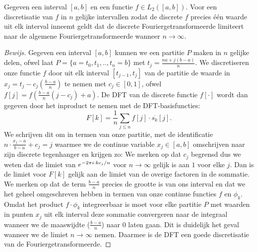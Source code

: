 \begin{stelling}
  Gegeven een interval $[a,b]$ en een functie $f\in L_2([a,b])$.
  Voor een discretisatie van $f$ in $n$ gelijke
  intervallen zodat de discrete $f$ precies \'e\'en waarde uit elk interval inneemt geldt dat de discrete
  Fouriergetransformeerde limiteert naar de algemene Fouriergetransformeerde wanneer $n\to\infty$.
\end{stelling}
\begin{proof}[Bewijs]
  Gegeven een interval $[a,b]$ kunnen we een partitie $P$ maken in $n$ gelijke delen, ofwel laat $P=\{a=t_0,t_1,..,t_n=b\}$ met $t_j = \tfrac{na + j(b-a)}{n}$.
  We discretiseren onze functie $f$ door uit elk interval $[t_{j-1},t_{j}]$ van de partitie de waarde in $x_j = t_j - c_j(\tfrac{b-a}{n})$ te nemen met $c_j \in [0,1]$, ofwel
  $f[j] = f(\frac{b-a}{n}(j-c_j) + a)$.
  De DFT van de discrete functie $f[\cdot]$ wordt dan gegeven door het inproduct te nemen met de DFT-basisfuncties:
  \[
  F[k] = \frac1n\sum_{j\leq n} f[j] \cdot \overline{s_k}[j].
  \]
  We schrijven dit om in termen van onze partitie, met de identificatie $n\cdot\tfrac{x_j-a}{b-a} + c_j= j$
  waarmee we de continue variable $x_j\in[a,b]$ omschrijven naar zijn discrete tegenhanger en krijgen zo:
  We merken op dat $c_j$ begrensd dus we weten dat de limiet van
  $e^{-{2\pi i}\cdot k c_j/n}$ voor $n\to\infty$ gelijk is aan $1$ voor elke $j$.
  Dan is de limiet voor $F[k]$ gelijk aan de limiet van de overige factoren in de sommatie.
  We merken op dat de term $\frac{b-a}{n}$ precies de grootte is van ons interval en dat we het geheel
  omgeschreven hebben in termen van onze continue functies $f$ en $\phi_k$.
  Omdat het product $f\cdot\phi_k$ integreerbaar is moet voor elke partitie $P$ met
  waarden in punten $x_j$ uit elk interval deze sommatie convergeren naar de integraal
  wanneer we de maaswijdte ($\tfrac{b-a}{n}$) naar $0$ laten gaan. Dit is duidelijk het geval wanneer we de limiet $n\to\infty$ nemen. Daarmee is de DFT een goede discretisatie van de Fouriergetransformeerde.
\end{proof}

